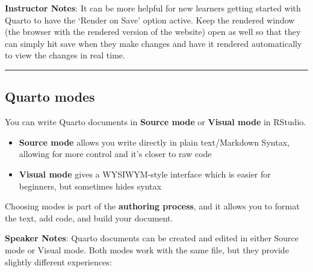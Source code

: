 \documentclass[
  letterpaper,
  DIV=11,
  numbers=noendperiod]{scrartcl}
\begin{document}
\textbf{Instructor Notes}: It can be more helpful for new learners
getting started with Quarto to have the `Render on Save' option active.
Keep the rendered window (the browser with the rendered version of the
website) open as well so that they can simply hit save when they make
changes and have it rendered automatically to view the changes in real
time.

\begin{center}\rule{0.5\linewidth}{0.5pt}\end{center}

\subsection{Quarto modes}\label{quarto-modes}

You can write Quarto documents in \textbf{Source mode} or \textbf{Visual
mode} in RStudio.

\begin{itemize}
\item
  \textbf{Source mode} allows you write directly in plain text/Markdown
  Syntax, allowing for more control and it's closer to raw code
\item
  \textbf{Visual mode} gives a WYSIWYM-style interface which is easier
  for beginners, but sometimes hides syntax
\end{itemize}

\begin{tcolorbox}[enhanced jigsaw, opacitybacktitle=0.6, toptitle=1mm, colbacktitle=quarto-callout-note-color!10!white, toprule=.15mm, left=2mm, colback=white, colframe=quarto-callout-note-color-frame, opacityback=0, bottomtitle=1mm, breakable, titlerule=0mm, rightrule=.15mm, arc=.35mm, title=\textcolor{quarto-callout-note-color}{\faInfo}\hspace{0.5em}{Note}, bottomrule=.15mm, coltitle=black, leftrule=.75mm]

Choosing modes is part of the \textbf{authoring process}, and it allows
you to format the text, add code, and build your document.

\end{tcolorbox}

\textbf{Speaker Notes}: Quarto documents can be created and edited in
either Source mode or Visual mode. Both modes work with the same file,
but they provide slightly different experiences:
\end{document}
